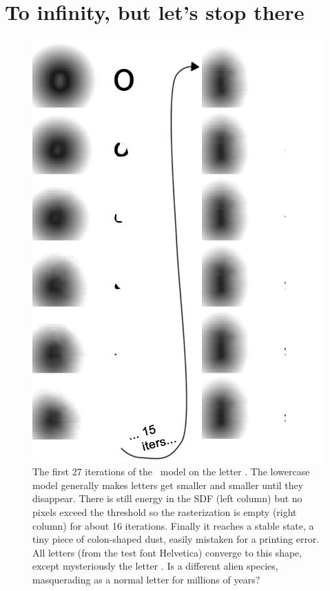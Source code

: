 \documentclass[twocolumn]{article}
\begin{document}
\section{To infinity, but let's stop there} \label{sec:lowestcase}

\begin{figure}[t]
\centering
  \includegraphics[width=0.80 \linewidth]{lowestcaseo}
  \caption{ The first 27 iterations of the \makelowercase\ model on
    the letter . The lowercase model generally makes
    letters get smaller and smaller until they disappear. There is
    still energy in the SDF (left column) but no pixels exceed the
    threshold so the rasterization is empty (right column) for about
    16 iterations. Finally it reaches a stable state, a tiny piece of
    colon-shaped dust, easily mistaken for a printing error. All
    letters (from the test font Helvetica) converge to this shape,
    except mysteriously the letter . Is  a
    different alien species, masquerading as a normal letter for
    millions of years? } \label{fig:lowestcaseo}
\end{figure}
\end{document}
